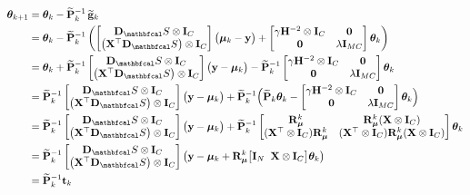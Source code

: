 \begin{align*}
    \thetaa_{k+1} &= \thetaa_k - \widetilde{\PP}^{-1}_k \, \widetilde{\g}_k\\
    &= \thetaa_k - \widetilde{\PP}^{-1}_k \left(\begin{bmatrix}
        \D_\St \otimes \I_C \\ \left(\X^\top \D_\St\right) \otimes \I_C
    \end{bmatrix} \big(\muu_k - \y\big) + \begin{bmatrix}
        \gamma \HH^{-2} \otimes \I_C & \zero \\
    \zero & \lambda \I_{MC}
    \end{bmatrix} \thetaa_k \right) \\
    &= \thetaa_k + \widetilde{\PP}^{-1}_k \begin{bmatrix}
        \D_\St \otimes \I_C \\ \left(\X^\top \D_\St\right) \otimes \I_C
    \end{bmatrix} \big(\y - \muu_k\big) - \widetilde{\PP}^{-1}_k  \begin{bmatrix}
        \gamma \HH^{-2} \otimes \I_C & \zero \\
    \zero & \lambda \I_{MC}
    \end{bmatrix} \thetaa_k \\
    &= \widetilde{\PP}^{-1}_k \begin{bmatrix}
        \D_\St \otimes \I_C \\ \left(\X^\top \D_\St\right) \otimes \I_C
    \end{bmatrix} \big(\y - \muu_k\big) + \widetilde{\PP}^{-1}_k \Big(\widetilde{\PP}_k \thetaa_k - \begin{bmatrix}
        \gamma \HH^{-2} \otimes \I_C & \zero \\
    \zero & \lambda \I_{MC}
    \end{bmatrix} \thetaa_k\Big) \\
    &= \widetilde{\PP}^{-1}_k \begin{bmatrix}
        \D_\St \otimes \I_C \\ \left(\X^\top \D_\St\right) \otimes \I_C
    \end{bmatrix} \big(\y - \muu_k\big) + \widetilde{\PP}^{-1}_k \begin{bmatrix}
        \RR_{\muu}^k & \RR_{\muu}^k (\X \otimes \I_C) \\ 
        (\X^\top \otimes \I_C) \RR_{\muu}^k  & (\X^\top \otimes \I_C) \RR_{\muu}^k (\X \otimes \I_C) 
    \end{bmatrix} \thetaa_k \\
    &= \widetilde{\PP}^{-1}_k  \begin{bmatrix}
        \D_\St \otimes \I_C \\ \left(\X^\top \D_\St\right) \otimes \I_C
    \end{bmatrix} \left( \y - \muu_k + \RR_{\muu}^k  \big[\I_N \;\; \X \otimes \I_C\big] \thetaa_k \right) \\
    &= \widetilde{\PP}^{-1}_k \tee_k
\end{align*}


